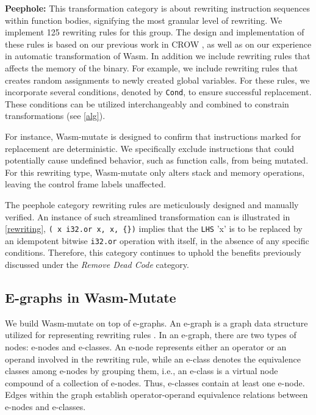 \documentclass[sigplan,screen]{acmart}
\newcommand*\badge[1]{ \colorbox{red}{\color{white}#1}}
\newcommand{\tool}{Wasm-mutate\xspace}
\newcommand{\wasm}{Wasm\xspace}
\newcommand{\todo}[1]{%
\refstepcounter{todo}
\noindent\textbf{\badge{TODO}} {\color{red}#1}
\addcontentsline{td}{todo}
{\color{red}\thesection.\thetodo\xspace #1}}
\begin{document}
\textbf{Peephole:} 
This transformation category is about rewriting instruction sequences within function bodies, signifying the most granular level of rewriting. 
We implement 125 rewriting rules for this group. 
The design and implementation of these rules is based on our previous work in CROW \cite{arteaga2020crow}, as well as on our experience in automatic transformation of \wasm.
In addition we include rewriting rules that affects the memory of the binary.
For example, we include rewriting rules that creates random assignments to newly created global variables.
For these rules, we incorporate several conditions, denoted by \texttt{Cond}, to ensure successful replacement. 
These conditions can be utilized interchangeably and combined to constrain transformations (see \autoref{alg}).

For instance, \tool is designed to confirm that instructions marked for replacement are deterministic. 
We specifically exclude instructions that could potentially cause undefined behavior, such as function calls, from being mutated. 
For this rewriting type, \tool only alters stack and memory operations, leaving the control frame labels unaffected.

The peephole category rewriting rules are meticulously designed and manually verified. 
An instance of such streamlined transformation can is illustrated in \autoref{rewriting}, \texttt{(\ x\ i32.or\ x, x, \{\})} implies that the \texttt{LHS} 'x' is to be replaced by an idempotent bitwise \texttt{i32.or} operation with itself, in the absence of any specific conditions.
Therefore, this category continues to uphold the benefits previously discussed under the \emph{Remove Dead Code} category.


\subsection{E-graphs in Wasm-Mutate}
We build \tool on top of e-graphs.
An e-graph is a graph data structure utilized for representing rewriting rules \cite{10.1145/3571207}. 
In an e-graph, there are two types of nodes: e-nodes and e-classes. 
An e-node represents either an operator or an operand involved in the rewriting rule, while an e-class denotes the equivalence classes among e-nodes by grouping them, i.e., an e-class is a virtual node compound of a collection of e-nodes. 
Thus, e-classes contain at least one e-node.
Edges within the graph establish operator-operand equivalence relations between e-nodes and e-classes.
\end{document}
